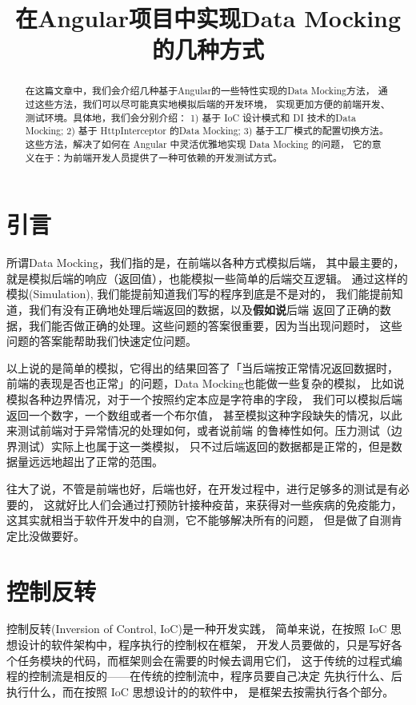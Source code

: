 \documentclass{ctexart}
\author{}
\title{在Angular项目中实现Data Mocking的几种方式}
\begin{document}
    \maketitle

    \begin{abstract}
        在这篇文章中，我们会介绍几种基于Angular的一些特性实现的Data Mocking方法，
        通过这些方法，我们可以尽可能真实地模拟后端的开发环境，
        实现更加方便的前端开发、测试环境。具体地，我们会分别介绍：
        1) 基于 IoC 设计模式和 DI 技术的Data Mocking;
        2) 基于 HttpInterceptor 的Data Mocking;
        3) 基于工厂模式的配置切换方法。
        这些方法，解决了如何在 Angular 中灵活优雅地实现 Data Mocking 的问题，
        它的意义在于：为前端开发人员提供了一种可依赖的开发测试方式。
    \end{abstract}

    \section{引言}

    所谓Data Mocking，我们指的是，在前端以各种方式模拟后端，
    其中最主要的，就是模拟后端的响应（返回值），也能模拟一些简单的后端交互逻辑。
    通过这样的模拟(Simulation), 我们能提前知道我们写的程序到底是不是对的，
    我们能提前知道，我们有没有正确地处理后端返回的数据，以及\textbf{假如说}后端
    返回了正确的数据，我们能否做正确的处理。这些问题的答案很重要，因为当出现问题时，
    这些问题的答案能帮助我们快速定位问题。

    以上说的是简单的模拟，它得出的结果回答了「当后端按正常情况返回数据时，
    前端的表现是否也正常」的问题，Data Mocking也能做一些复杂的模拟，
    比如说模拟各种边界情况，对于一个按照约定本应是字符串的字段，
    我们可以模拟后端返回一个数字，一个数组或者一个布尔值，
    甚至模拟这种字段缺失的情况，以此来测试前端对于异常情况的处理如何，或者说前端
    的鲁棒性如何。压力测试（边界测试）实际上也属于这一类模拟，
    只不过后端返回的数据都是正常的，但是数据量远远地超出了正常的范围。

    往大了说，不管是前端也好，后端也好，在开发过程中，进行足够多的测试是有必要的，
    这就好比人们会通过打预防针接种疫苗，来获得对一些疾病的免疫能力，
    这其实就相当于软件开发中的自测，它不能够解决所有的问题，
    但是做了自测肯定比没做要好。

    \section{控制反转}

    控制反转(Inversion of Control, IoC)是一种开发实践，
    简单来说，在按照 IoC 思想设计的软件架构中，程序执行的控制权在框架，
    开发人员要做的，只是写好各个任务模块的代码，而框架则会在需要的时候去调用它们，
    这于传统的过程式编程的控制流是相反的——在传统的控制流中，程序员要自己决定
    先执行什么、后执行什么，而在按照 IoC 思想设计的的软件中，
    是框架去按需执行各个部分。
\end{document}
